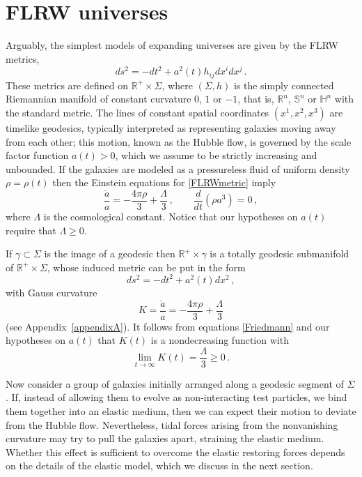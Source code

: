 \documentclass[10pt]{amsart}
\newcommand{\bbH}{\mathbb{H}}
\newcommand{\bbS}{\mathbb{S}}
\newcommand{\bbR}{\mathbb{R}}      %
\begin{document}
\section{FLRW universes}\label{section1}
%
Arguably, the simplest models of expanding universes are given by the FLRW metrics,
\begin{equation} \label{FLRWmetric}
ds^2 = - dt^2 + a^2(t) h_{ij} dx^i dx^j \, .
\end{equation}
These metrics are defined on $\bbR^+ \times \Sigma$, where $(\Sigma, h)$ is the simply connected Riemannian manifold of constant curvature $0$, $1$ or $-1$, that is, $\bbR^n$, $\bbS^n$ or $\bbH^n$ with the standard metric. The lines of constant spatial coordinates $(x^1,x^2,x^3)$ are timelike geodesics, typically interpreted as representing galaxies moving away from each other; this motion, known as the Hubble flow, is governed by the scale factor function $a(t) > 0$, which we assume to be strictly increasing and unbounded. If the galaxies are modeled as a pressureless fluid of uniform density $\rho=\rho(t)$ then the Einstein equations for \eqref{FLRWmetric} imply
\begin{equation} \label{Friedmann}
\frac{\ddot{a}}{a} = - \frac{4\pi\rho}{3} + \frac{\Lambda}{3} \, , \qquad \frac{d}{dt} \left( \rho a^3 \right) = 0 \, ,
\end{equation}
where $\Lambda$ is the  cosmological constant. Notice that our hypotheses on $a(t)$ require that $\Lambda \geq 0$.

If $\gamma \subset \Sigma$ is the image of a geodesic then $\bbR^+ \times \gamma$ is a totally geodesic submanifold of $\bbR^+ \times \Sigma$, whose induced metric can be put in the form
\begin{equation} \label{FLRWmetric2D}
ds^2 = - dt^2 + a^2(t) dx^2 \, ,
\end{equation}
with Gauss curvature
\begin{equation}
K = \frac{\ddot{a}}{a} = - \frac{4\pi\rho}{3} + \frac{\Lambda}{3}
\end{equation}
(see Appendix~\ref{appendixA}). It follows from equations \eqref{Friedmann} and our hypotheses on $a(t)$ that $K(t)$ is a nondecreasing function with
\begin{equation}
\lim_{t \to \infty} K(t) = \frac{\Lambda}3 \geq 0 \, .
\end{equation}

Now consider a group of galaxies initially arranged along a geodesic segment of $\Sigma$. If, instead of allowing them to evolve as non-interacting test particles, we bind them together into an elastic medium, then we can expect their motion to deviate from the Hubble flow. Nevertheless, tidal forces arising from the nonvanishing curvature may try to pull the galaxies apart, straining the elastic medium. Whether this effect is sufficient to overcome the elastic restoring forces depends on the details of the elastic model, which we discuss in the next section.
%
%
%
\end{document}
